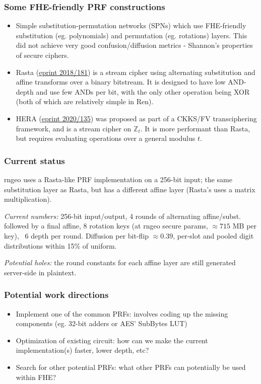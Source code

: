 \documentclass{beamer}
\begin{document}
\begin{frame}
\frametitle{Some FHE-friendly PRF constructions}

\begin{itemize}[<+->]
    \item Simple substitution-permutation networks (SPNs) which use FHE-friendly substitution (eg. polynomials) and permutation (eg. rotations) layers.
    This did not achieve very good confusion/diffusion metrics - Shannon's properties of secure ciphers.
    \item Rasta (\href{https://eprint.iacr.org/2018/181.pdf}{eprint 2018/181}) is a stream cipher using alternating substitution and affine transforms over a binary bitstream.
    It is designed to have low AND-depth and use few ANDs per bit, with the only other operation being XOR (both of which are relatively simple in Ren).
    \item HERA (\href{https://eprint.iacr.org/2020/1335.pdf}{eprint 2020/135}) was proposed as part of a CKKS/FV transciphering framework, and is a stream cipher on $\mathbb{Z}_t$.
    It is more performant than Rasta, but requires evaluating operations over a general modulus $t$.
\end{itemize}
\end{frame}

\begin{frame}
\frametitle{Current status}
rngeo uses a Rasta-like PRF implementation on a 256-bit input; the same substitution layer as Rasta, but has a different affine layer (Rasta's uses a matrix multiplication).

\pause
\vspace{0.5cm}
\textit{Current numbers:} 256-bit input/output, 4 rounds of alternating affine/subst. followed by a final affine, 8 rotation keys (at rngeo secure params, $\approx 715$ MB per key), ~6 depth per round.
Diffusion per bit-flip $\approx 0.39$, per-slot and pooled digit distributions within 15\% of uniform. 

\pause
\vspace{0.5cm}
\textit{Potential holes:} the round constants for each affine layer are still generated server-side in plaintext. 
\end{frame}

\begin{frame}
\frametitle{Potential work directions}
\begin{itemize}
    \item Implement one of the common PRFs: involves coding up the missing components (eg. 32-bit adders or AES' SubBytes LUT)
    \item Optimization of existing circuit: how can we make the current implementation(s) faster, lower depth, etc?
    \item Search for other potential PRFs: what other PRFs can potentially be used within FHE?
\end{itemize}
\end{frame}
\end{document}
